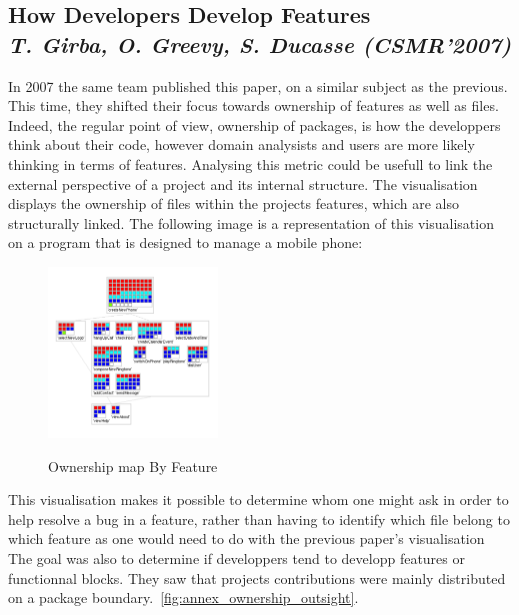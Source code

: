 \subsection{How Developers Develop Features\\ \textit{T. Girba, O. Greevy, S. Ducasse (CSMR'2007)}}

In 2007 the same team published this paper\cite{Girba2007}, on a similar subject as the previous. This time, they shifted their focus towards ownership of features as well as files. Indeed, the regular point of view, ownership of packages, is how the developpers think about their code, however domain analysists and users are more likely thinking in terms of features. Analysing this metric could be usefull to link the external perspective of a project and its internal structure.
The visualisation displays the ownership of files within the projects features, which are also structurally linked. The following image is a representation of this visualisation on a program that is designed to manage a mobile phone:

\begin{figure}[H]
\centering
\includegraphics[width=0.4\textwidth]{./resources/girba2007.png}~
\caption{Ownership map By Feature}
\label{fig:ownership_map_by_feature}
\end{figure}

This visualisation makes it possible to determine whom one might ask in order to help resolve a bug in a feature, rather than having to identify which file belong to which feature as one would need to do with the previous paper's visualisation
The goal was also to determine if developpers tend to developp features or functionnal blocks. They saw that projects contributions were mainly distributed on a package boundary.~\ref{fig:annex_ownership_outsight}.
